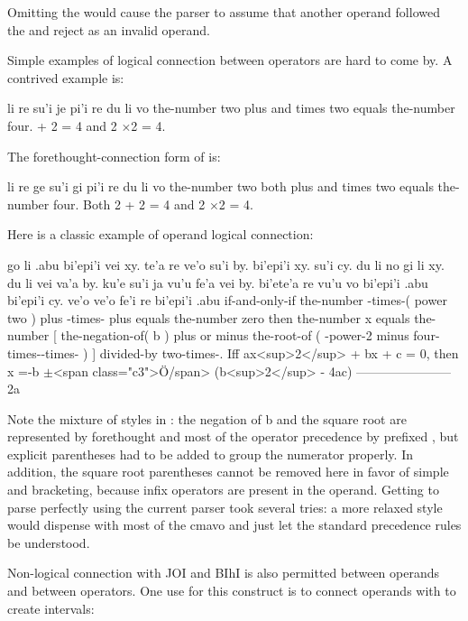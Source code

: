 Omitting the  would cause the parser to assume that
    another operand followed the  and reject  as an
    invalid operand.

Simple examples of logical connection between operators are
    hard to come by. A contrived example is:
\begin{example}
li re su'i je pi'i re du li vo\n
the-number two plus and times two equals the-number four. + 2 = 4 and 2 $\times$2 = 4.
\end{example}

The forethought-connection form of  is:
\begin{example}
li re ge su'i gi pi'i re\n
\T	du li vo\n
the-number two both plus and times two\n
\T	equals the-number four.\n
Both 2 + 2 = 4 and 2 $\times$2 = 4.
\end{example}

Here is a classic example of operand logical connection:
\begin{example}
go li .abu bi'epi'i vei xy. te'a re ve'o\n
\T	su'i by. bi'epi'i xy. su'i cy.\n
\T	du li no\n
gi li xy. du li vei va'a by. ku'e\n
\T	su'i ja vu'u fe'a\n
\T	vei by. bi'ete'a re vu'u\n
\T	vo bi'epi'i .abu bi'epi'i cy. ve'o  ve'o\n
\T	fe'i re bi'epi'i .abu\n
if-and-only-if the-number -times-(  power two )\n
\T	plus -times- plus \n
\T	equals the-number zero\n
then the-number x equals the-number [ the-negation-of( b )\n
\T	plus or minus the-root-of\n
\T	( -power-2 minus\n
\T	four-times--times- ) ]\n
\T	divided-by two-times-.\n
Iff ax<sup>2</sup>  + bx + c = 0,\n
\T	then x =-b $\pm$<span class="c3">\"{O}/span>
(b<sup>2</sup>  - 4ac)\n
\T	-----------------------\n
\T	2a
\end{example}

Note the mixture of styles in : the negation of b and the square root are represented
    by forethought and most of the operator precedence by prefixed
    , but explicit parentheses had to be added to group the
    numerator properly. In addition, the square root parentheses
    cannot be removed here in favor of simple  and 
    bracketing, because infix operators are present in the operand.
    Getting  to parse perfectly
    using the current parser took several tries: a more relaxed
    style would dispense with most of the  cmavo and just
    let the standard precedence rules be understood. 

Non-logical connection with JOI and BIhI is also permitted
    between operands and between operators. One use for this
    construct is to connect operands with  to create
    intervals:
\begin{example}
li no ga'o bi'o ke'i pa\n
the-number zero (inclusive) from-to (exclusive) one\n
\optional{0,1)\n
the numbers from zero to one, including zero\n
\T	but not including one
\end{example}

